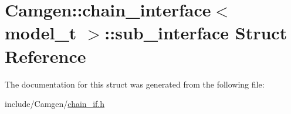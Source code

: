\hypertarget{a00512}{\section{Camgen\-:\-:chain\-\_\-interface$<$ model\-\_\-t $>$\-:\-:sub\-\_\-interface Struct Reference}
\label{a00512}
}


The documentation for this struct was generated from the following file\-:\begin{DoxyCompactItemize}
\item 
include/\-Camgen/\hyperlink{a00589}{chain\-\_\-if.\-h}\end{DoxyCompactItemize}
